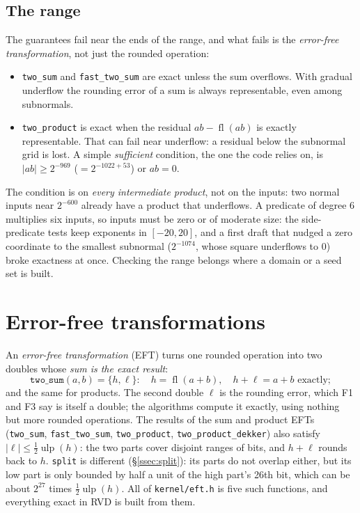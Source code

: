 \documentclass[11pt,a4paper]{article}
\newcommand{\code}[1]{\texttt{#1}}
\newcommand{\fl}{\operatorname{fl}}
\newcommand{\ulp}{\operatorname{ulp}}
\newcommand{\secref}[1]{\S\ref{#1}}
\theoremstyle{definition}
\theoremstyle{remark}
\begin{document}
\subsection{The range}

The guarantees fail near the ends of the range, and what fails is the \emph{error-free
transformation}, not just the rounded operation:
\begin{itemize}
  \item \code{two\_sum} and \code{fast\_two\_sum} are exact unless the sum overflows. With gradual
    underflow the rounding error of a sum is always representable, even among subnormals.
  \item \code{two\_product} is exact when the residual $ab - \fl(ab)$ is exactly representable.
    That can fail near underflow: a residual below the subnormal grid is lost. A simple
    \emph{sufficient} condition, the one the code relies on, is $|ab| \ge 2^{-969}$
    ($= 2^{-1022+53}$) or $ab = 0$.
\end{itemize}
The condition is on \emph{every intermediate product}, not on the inputs: two normal inputs near
$2^{-600}$ already have a product that underflows. A predicate of degree 6 multiplies six
inputs, so inputs must be zero or of moderate size: the side-predicate tests keep exponents in
$[-20, 20]$, and a first draft that nudged a zero coordinate to the smallest subnormal
($2^{-1074}$, whose square underflows to 0) broke exactness at once. Checking the range belongs
where a domain or a seed set is built.

\section{Error-free transformations}\label{sec:eft}

An \emph{error-free transformation} (EFT) turns one rounded operation into two doubles whose
\emph{sum is the exact result}:
\[
  \code{two\_sum}(a,b) = \{h, \ell\}:\quad h = \fl(a+b),\quad h + \ell = a + b \text{ exactly};
\]
and the same for products. The second double $\ell$ is the rounding error, which F1 and F3
say is itself a double; the algorithms compute it exactly, using nothing but more rounded
operations. The results of the sum and product EFTs (\code{two\_sum}, \code{fast\_two\_sum},
\code{two\_product}, \code{two\_product\_dekker}) also satisfy $|\ell| \le \tfrac12\ulp(h)$: the
two parts cover disjoint ranges of bits, and $h + \ell$ rounds back to $h$. \code{split} is
different (\secref{ssec:split}): its parts do not overlap either, but its low part is only bounded
by half a unit of the high part's 26th bit, which can be about $2^{27}$ times $\tfrac12\ulp(h)$.
All of \code{kernel/eft.h} is five such functions, and everything exact in RVD is built from
them.
\end{document}
